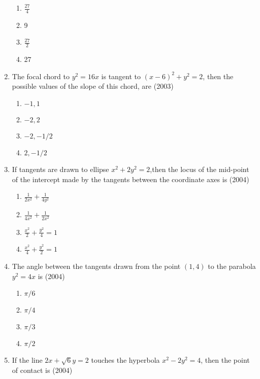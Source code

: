 \begin{enumerate}[label=\thesubsection.\arabic*.,ref=\thesubsection.\theenumi]
\begin{multicols}{4}
\begin{enumerate}
	\item $\frac{27}{4}$ 
    \item 9 
    \item $\frac{27}{2}$ 
    \item 27 
 \end{enumerate}
\end{multicols}
\item The focal chord to $y^{2}=16x$ is tangent to $(x-6)^{2}+y^{2}=2$, then the possible values of the slope of this chord, are \hfill{(2003)}
\begin{multicols}{4}
\begin{enumerate}
    \item ${-1,1}$
    \item ${-2,2}$
    \item ${-2,-1/2}$
    \item ${2,-1/2}$
\end{enumerate}
\end{multicols}
\item If tangents are drawn to ellipse $x^{2}+2y^{2}=2$,then the locus of the mid-point of the intercept made by the tangents between the coordinate axes is 
\hfill{(2004)}
\begin{multicols}{4}
\begin{enumerate}
    \item $\frac{1}{2x^{2}}+\frac{1}{4y^{2}}$ 
    \item $\frac{1}{4x^{2}}+\frac{1}{2x^{2}}$ 
    \item $\frac{x^{2}}{2}+\frac{y^{2}}{4}=1$
    \item $\frac{x^{2}}{4}+\frac{y^{2}}{2}=1$ 
\end{enumerate}
\end{multicols}
\item The angle between the tangents drawn from the point ${(1,4)}$ to the parabola $y^{2}=4x$ is 
\hfill{(2004)}
\begin{multicols}{4}
\begin{enumerate}
    \item $\pi/6$ 
    \item $\pi/4$ 
    \item $\pi/3$
    \item $\pi/2$
\end{enumerate}
\end{multicols}
\item If the line $2x+\sqrt{6}y=2$ touches the hyperbola $x^{2}-2y^{2}=4$, then the point of contact is \hfill{(2004)}
\begin{multicols}{4}

\end{multicols}
\end{enumerate}
